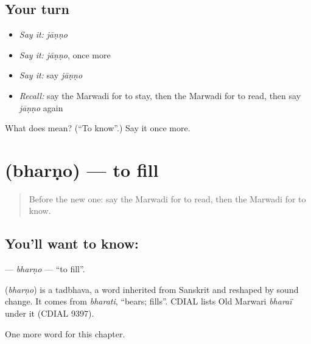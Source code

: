 \subsection*{Your turn}
\begin{itemize}
\raggedright
  \item \emph{Say it:} \emph{jāṇṇo}
  \item \emph{Say it:} \emph{jāṇṇo}, once more
  \item \emph{Say it:} say \emph{jāṇṇo}
  \item \emph{Recall:} say the Marwadi for to stay, then the Marwadi for to read, then say \emph{jāṇṇo} again
\end{itemize}

\begin{tcolorbox}[breakable,colback=teal!4,colframe=teal!35!black,title={Before you move on}]
What does  mean? (\textquotedblleft{}To know\textquotedblright{}.) Say it once more.
\end{tcolorbox}
\section[\texorpdfstring{\mw{भरणो} (bharṇo)}{भरणो (bharṇo)}]{ (bharṇo) — to fill}

\label{lesson:MW-C105-bharno}



\begin{quote}
Before the new one: say the Marwadi for to read, then the Marwadi for to know.
\end{quote}

\subsection*{You'll want to know: }
\textbf{} — \emph{bharṇo} — \textquotedblleft{}to fill\textquotedblright{}.

\begin{cousinweb}
\textbf{} (\emph{bharṇo}) is a tadbhava, a word inherited from Sanskrit and reshaped by sound change. It comes from \emph{bharati}, \textquotedblleft{}bears; fills\textquotedblright{}. CDIAL lists Old Marwari \emph{bharaï} under it (CDIAL 9397).
\end{cousinweb}

\begin{grammarlens}[title={What you've built}]
One more word for this chapter.
\end{grammarlens}

